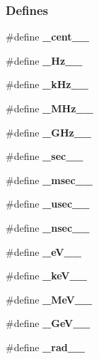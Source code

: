\subsubsection*{Defines}
\begin{CompactItemize}
\item 
\#define \textbf{\_\-cent\_\-\_\-}\label{bpm__units_8h_c2f27897720a83e5d9474dac8951851b}

\item 
\#define \textbf{\_\-Hz\_\-\_\-}\label{bpm__units_8h_c57ab8c2a60732065d0d3512b4cb9188}

\item 
\#define \textbf{\_\-kHz\_\-\_\-}\label{bpm__units_8h_0ebbaad5a400d7ba82b68128f055ce53}

\item 
\#define \textbf{\_\-MHz\_\-\_\-}\label{bpm__units_8h_922319dd65150e338e4e6c9126a60f81}

\item 
\#define \textbf{\_\-GHz\_\-\_\-}\label{bpm__units_8h_dbe5c54339b443d046f46d2377a808cb}

\item 
\#define \textbf{\_\-sec\_\-\_\-}\label{bpm__units_8h_bfbfa7a22469a4440d1e02bc43cc6615}

\item 
\#define \textbf{\_\-msec\_\-\_\-}\label{bpm__units_8h_a54363851f60be5a02df036353249167}

\item 
\#define \textbf{\_\-usec\_\-\_\-}\label{bpm__units_8h_90a629ff53f070b7dd03b5cd87d319c7}

\item 
\#define \textbf{\_\-nsec\_\-\_\-}\label{bpm__units_8h_893d2e7473157813593484c99d9c6211}

\item 
\#define \textbf{\_\-eV\_\-\_\-}\label{bpm__units_8h_30737d7facf39b26a89729d9039c8405}

\item 
\#define \textbf{\_\-keV\_\-\_\-}\label{bpm__units_8h_80e0bc381ee56da0c7eafd51e19da244}

\item 
\#define \textbf{\_\-MeV\_\-\_\-}\label{bpm__units_8h_af7586a4c5c9e9e3160fae3be37dd025}

\item 
\#define \textbf{\_\-GeV\_\-\_\-}\label{bpm__units_8h_1f77efef66be3ec74299798f4c61630f}

\item 
\#define \textbf{\_\-rad\_\-\_\-}\label{bpm__units_8h_2ff9f709eecf1125273f0998095aec96}


\end{CompactItemize}
